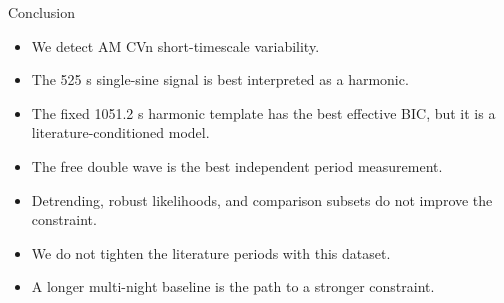 \documentclass[aspectratio=169]{beamer}
\begin{document}
\begin{frame}{Conclusion}
  \begin{itemize}
    \item We detect AM CVn short-timescale variability.
    \item The 525 s single-sine signal is best interpreted as a harmonic.
    \item The fixed 1051.2 s harmonic template has the best effective BIC, but it is a literature-conditioned model.
    \item The free double wave is the best independent period measurement.
    \item Detrending, robust likelihoods, and comparison subsets do not improve the constraint.
    \item We do not tighten the literature periods with this dataset.
    \item A longer multi-night baseline is the path to a stronger constraint.
  \end{itemize}
\end{frame}
\end{document}
